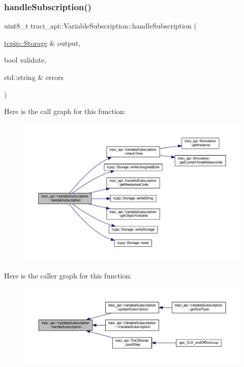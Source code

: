 \subsubsection{\texorpdfstring{handle\+Subscription()}{handleSubscription()}}
{\footnotesize\ttfamily uint8\+\_\+t traci\+\_\+api\+::\+Variable\+Subscription\+::handle\+Subscription (\begin{DoxyParamCaption}\item[{\hyperlink{classtcpip_1_1_storage}{tcpip\+::\+Storage} \&}]{output,  }\item[{bool}]{validate,  }\item[{std\+::string \&}]{errors }\end{DoxyParamCaption})}

Here is the call graph for this function\+:
\nopagebreak
\begin{figure}[H]
\begin{center}
\leavevmode
\includegraphics[width=350pt]{classtraci__api_1_1_variable_subscription_ab75320e8ec7d1406ea47a703fb09de63_cgraph}
\end{center}
\end{figure}
Here is the caller graph for this function\+:
\nopagebreak
\begin{figure}[H]
\begin{center}
\leavevmode
\includegraphics[width=350pt]{classtraci__api_1_1_variable_subscription_ab75320e8ec7d1406ea47a703fb09de63_icgraph}
\end{center}
\end{figure}
\mbox{\label{classtraci__api_1_1_variable_subscription_a4a56033c7b432c2e2d029ca5fd5c3468}} 

